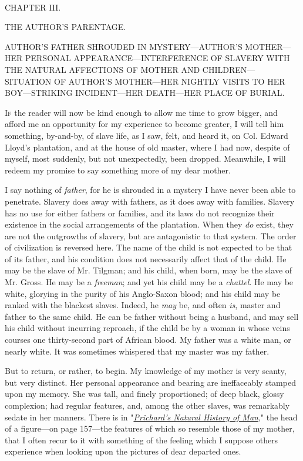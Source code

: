 {\protect\hypertarget{51}{}{}}

~

{CHAPTER III.}

THE AUTHOR'S PARENTAGE.

{AUTHOR'S FATHER SHROUDED IN MYSTERY---AUTHOR'S MOTHER---HER PERSONAL
APPEARANCE---INTERFERENCE OF SLAVERY WITH THE NATURAL AFFECTIONS OF
MOTHER AND CHILDREN---SITUATION OF AUTHOR'S MOTHER---HER NIGHTLY VISITS
TO HER BOY---STRIKING INCIDENT---HER DEATH---HER PLACE OF BURIAL.}

\textsc{If} the reader will now be kind enough to allow me time to grow
bigger, and afford me an opportunity for my experience to become
greater, I will tell him something, by-and-by, of slave life, as I saw,
felt, and heard it, on Col. Edward Lloyd's plantation, and at the house
of old master, where I had now, despite of myself, most suddenly, but
not unexpectedly, been dropped. Meanwhile, I will redeem my promise to
say something more of my dear mother.

I say nothing of \emph{father}, for he is shrouded in a mystery I have
never been able to penetrate. Slavery does away with fathers, as it does
away with families. Slavery has no use for either fathers or families,
and its laws do not recognize their existence in the social arrangements
of the plantation. When they \emph{do} exist, they are not the
outgrowths of slavery, but are antagonistic to that system. The order of
civilization is reversed here. The name of the child is not expected to
be that of its father, and his {\protect\hypertarget{52}{}{}}condition
does not necessarily affect that of the child. He may be the slave of
Mr. Tilgman; and his child, when born, may be the slave of Mr. Gross. He
may be a \emph{freeman}; and yet his child may be a \emph{chattel}. He
may be white, glorying in the purity of his Anglo-Saxon blood; and his
child may be ranked with the blackest slaves. Indeed, he \emph{may} be,
and often \emph{is}, master and father to the same child. He can be
father without being a husband, and may sell his child without incurring
reproach, if the child be by a woman in whose veins courses one
thirty-second part of African blood. My father was a white man, or
nearly white. It was sometimes whispered that my master was my father.

But to return, or rather, to begin. My knowledge of my mother is very
scanty, but very distinct. Her personal appearance and bearing are
ineffaceably stamped upon my memory. She was tall, and finely
proportioned; of deep black, glossy complexion; had regular features,
and, among the other slaves, was remarkably sedate in her manners. There
is in
"\emph{\href{/w/index.php?title=The_Natural_History_of_Man_(Prichard)\&action=edit\&redlink=1}{Prichard's
Natural History of Man}}," the head of a figure---on page 157---the
features of which so resemble those of my mother, that I often recur to
it with something of the feeling which I suppose others experience when
looking upon the pictures of dear departed ones.

